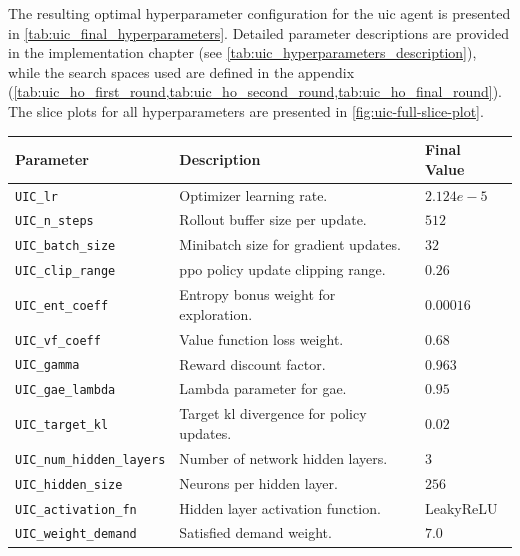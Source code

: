 The resulting optimal hyperparameter configuration for the \gls{uic} agent is presented in \autoref{tab:uic_final_hyperparameters}.
Detailed parameter descriptions are provided in the implementation chapter (see \autoref{tab:uic_hyperparameters_description}), while the search spaces used are defined in the appendix (\cref{tab:uic_ho_first_round,tab:uic_ho_second_round,tab:uic_ho_final_round}).
The slice plots for all hyperparameters are presented in \autoref{fig:uic-full-slice-plot}.

\begin{table}[!htb]
    \centering
    \begin{tabularx}{\textwidth}{lXl}
        \toprule
        Parameter & Description & Final Value \\
        \midrule
        \texttt{UIC\_lr}                    & Optimizer learning rate.                  & $2.124  e-5$ \\
        \texttt{UIC\_n\_steps}              & Rollout buffer size per update.           & $512$ \\
        \texttt{UIC\_batch\_size}           & Minibatch size for gradient updates.      & $32$ \\
        \texttt{UIC\_clip\_range}           & \gls{ppo} policy update clipping range.         & $0.26$\\
        \texttt{UIC\_ent\_coeff}            & Entropy bonus weight for exploration.     & $0.00016$\\
        \texttt{UIC\_vf\_coeff}             & Value function loss weight.               & $0.68$\\
        \midrule
        \texttt{UIC\_gamma}                 & Reward discount factor.                   & $0.963$ \\
        \texttt{UIC\_gae\_lambda}           & Lambda parameter for \gls{gae}.                  & $0.95$ \\
        \texttt{UIC\_target\_kl}            & Target \gls{kl} divergence for policy updates.  & $0.02$\\
        \midrule
        \texttt{UIC\_num\_hidden\_layers}   & Number of network hidden layers.          & $3$\\
        \texttt{UIC\_hidden\_size}          & Neurons per hidden layer.                 & $256$ \\
        \texttt{UIC\_activation\_fn}        & Hidden layer activation function.         & LeakyReLU \\
        \midrule
        \texttt{UIC\_weight\_demand}        & Satisfied demand weight.                   & $7.0$ \\

\end{tabularx}
\end{table}
